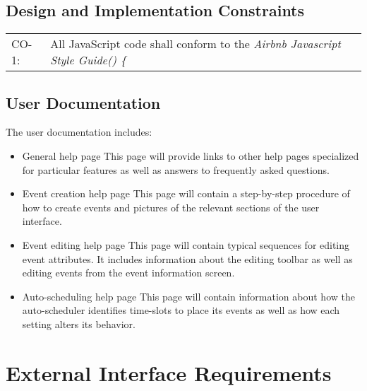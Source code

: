 \documentclass{scrreprt}
\begin{document}
\section{Design and Implementation Constraints}
\begin{center}
\begin{longtable}{ p{2cm} p{13cm} }
CO-1: & All JavaScript code shall conform to the \textit{Airbnb Javascript Style Guide() \{} \\
\end{longtable}
\end{center}

\section{User Documentation}
The user documentation includes:
\begin{itemize}
    \item General help page\newline
    This page will provide links to other help pages specialized for particular
    features as well as answers to frequently asked questions.
    \item Event creation help page\newline
    This page will contain a step-by-step procedure of how to create events
    and pictures of the relevant sections of the user interface.
    \item Event editing help page\newline
    This page will contain typical sequences for editing event attributes. It
    includes information about the editing toolbar as well as editing events
    from the event information screen.
    \item Auto-scheduling help page\newline
    This page will contain information about how the auto-scheduler identifies
    time-slots to place its events as well as how each setting alters its behavior.
\end{itemize}


\chapter{External Interface Requirements}
\end{document}

